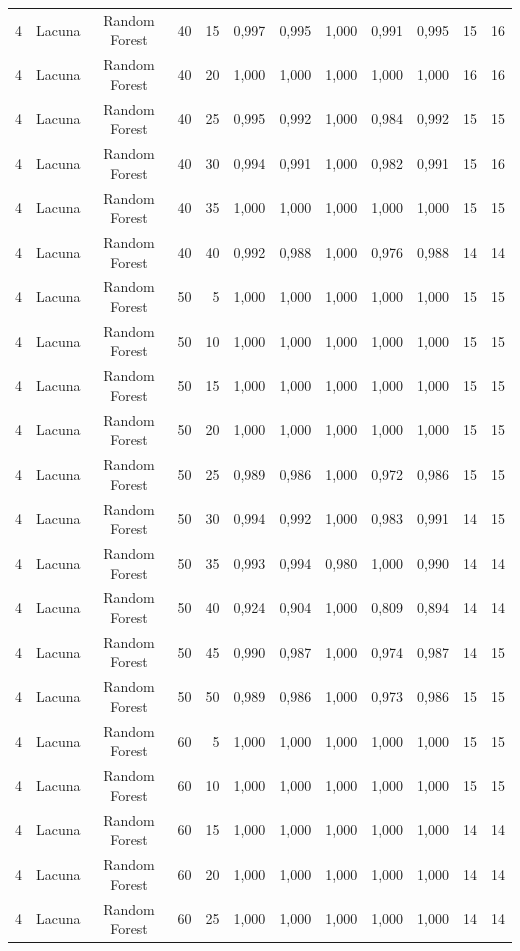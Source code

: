 \begin{longtable}{ccclrrrrrrrr}
4 & Lacuna & Random Forest & 40 & 15 & 0,997 & 0,995 & 1,000 & 0,991 & 0,995 & 15 & 16 \\
4 & Lacuna & Random Forest & 40 & 20 & 1,000 & 1,000 & 1,000 & 1,000 & 1,000 & 16 & 16 \\
4 & Lacuna & Random Forest & 40 & 25 & 0,995 & 0,992 & 1,000 & 0,984 & 0,992 & 15 & 15 \\
4 & Lacuna & Random Forest & 40 & 30 & 0,994 & 0,991 & 1,000 & 0,982 & 0,991 & 15 & 16 \\
4 & Lacuna & Random Forest & 40 & 35 & 1,000 & 1,000 & 1,000 & 1,000 & 1,000 & 15 & 15 \\
4 & Lacuna & Random Forest & 40 & 40 & 0,992 & 0,988 & 1,000 & 0,976 & 0,988 & 14 & 14 \\
4 & Lacuna & Random Forest & 50 & 5 & 1,000 & 1,000 & 1,000 & 1,000 & 1,000 & 15 & 15 \\
4 & Lacuna & Random Forest & 50 & 10 & 1,000 & 1,000 & 1,000 & 1,000 & 1,000 & 15 & 15 \\
4 & Lacuna & Random Forest & 50 & 15 & 1,000 & 1,000 & 1,000 & 1,000 & 1,000 & 15 & 15 \\
4 & Lacuna & Random Forest & 50 & 20 & 1,000 & 1,000 & 1,000 & 1,000 & 1,000 & 15 & 15 \\
4 & Lacuna & Random Forest & 50 & 25 & 0,989 & 0,986 & 1,000 & 0,972 & 0,986 & 15 & 15 \\
4 & Lacuna & Random Forest & 50 & 30 & 0,994 & 0,992 & 1,000 & 0,983 & 0,991 & 14 & 15 \\
4 & Lacuna & Random Forest & 50 & 35 & 0,993 & 0,994 & 0,980 & 1,000 & 0,990 & 14 & 14 \\
4 & Lacuna & Random Forest & 50 & 40 & 0,924 & 0,904 & 1,000 & 0,809 & 0,894 & 14 & 14 \\
4 & Lacuna & Random Forest & 50 & 45 & 0,990 & 0,987 & 1,000 & 0,974 & 0,987 & 14 & 15 \\
4 & Lacuna & Random Forest & 50 & 50 & 0,989 & 0,986 & 1,000 & 0,973 & 0,986 & 15 & 15 \\
4 & Lacuna & Random Forest & 60 & 5 & 1,000 & 1,000 & 1,000 & 1,000 & 1,000 & 15 & 15 \\
4 & Lacuna & Random Forest & 60 & 10 & 1,000 & 1,000 & 1,000 & 1,000 & 1,000 & 15 & 15 \\
4 & Lacuna & Random Forest & 60 & 15 & 1,000 & 1,000 & 1,000 & 1,000 & 1,000 & 14 & 14 \\
4 & Lacuna & Random Forest & 60 & 20 & 1,000 & 1,000 & 1,000 & 1,000 & 1,000 & 14 & 14 \\
4 & Lacuna & Random Forest & 60 & 25 & 1,000 & 1,000 & 1,000 & 1,000 & 1,000 & 14 & 14 \\

\end{longtable}
